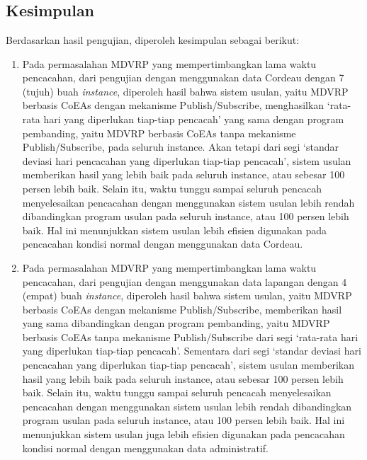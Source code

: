 \chapter{\kesimpulan}


\section{Kesimpulan}
Berdasarkan hasil pengujian, diperoleh kesimpulan sebagai berikut:

\begin{enumerate}
	\item Pada permasalahan MDVRP yang mempertimbangkan lama waktu pencacahan, dari pengujian dengan menggunakan data Cordeau dengan 7 (tujuh) buah \textit{instance}, diperoleh hasil bahwa sistem usulan, yaitu MDVRP berbasis CoEAs dengan mekanisme Publish/Subscribe, menghasilkan `rata-rata hari yang diperlukan tiap-tiap pencacah' yang sama dengan program pembanding, yaitu MDVRP berbasis CoEAs tanpa mekanisme Publish/Subscribe, pada seluruh instance. Akan tetapi dari segi `standar deviasi hari pencacahan yang diperlukan tiap-tiap pencacah', sistem usulan memberikan hasil yang lebih baik pada seluruh instance, atau sebesar 100 persen lebih baik. Selain itu, waktu tunggu sampai seluruh pencacah menyelesaikan pencacahan dengan menggunakan sistem usulan lebih rendah dibandingkan program usulan pada seluruh instance, atau 100 persen lebih baik. Hal ini menunjukkan sistem usulan lebih efisien digunakan pada pencacahan kondisi normal dengan menggunakan data Cordeau.
	
	\item Pada permasalahan MDVRP yang mempertimbangkan lama waktu pencacahan, dari pengujian dengan menggunakan data lapangan dengan 4 (empat) buah \textit{instance}, diperoleh hasil bahwa sistem usulan, yaitu MDVRP berbasis CoEAs dengan mekanisme Publish/Subscribe, memberikan hasil yang sama dibandingkan dengan program pembanding, yaitu MDVRP berbasis CoEAs tanpa mekanisme Publish/Subscribe dari segi `rata-rata hari yang diperlukan tiap-tiap pencacah'. Sementara dari segi `standar deviasi hari pencacahan yang diperlukan tiap-tiap pencacah', sistem usulan memberikan hasil yang lebih baik pada seluruh instance, atau sebesar 100 persen lebih baik. Selain itu, waktu tunggu sampai seluruh pencacah menyelesaikan pencacahan dengan menggunakan sistem usulan lebih rendah dibandingkan program usulan pada seluruh instance, atau 100 persen lebih baik. Hal ini menunjukkan sistem usulan juga lebih efisien digunakan pada pencacahan kondisi normal dengan menggunakan data administratif.
	

\end{enumerate}
